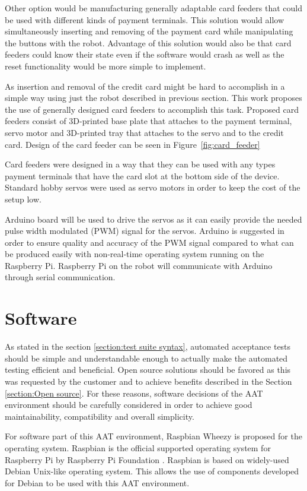 Other option would be manufacturing generally adaptable card feeders that could be used with different kinds of payment terminals. This solution would allow simultaneously inserting and removing of the payment card while manipulating the buttons with the robot. Advantage of this solution would also be that card feeders could know their state even if the software would crash as well as the reset functionality would be more simple to implement.

As insertion and removal of the credit card might be hard to accomplish in a simple way using just the robot described in previous section. This work proposes the use of generally designed card feeders to accomplish this task. Proposed card feeders consist of 3D-printed base plate that attaches to the payment terminal, servo motor and 3D-printed tray that attaches to the servo and to the credit card. Design of the card feeder can be seen in Figure~\ref{fig:card_feeder}

Card feeders were designed in a way that they can be used with any types payment terminals that have the card slot at the bottom side of the device. Standard hobby servos were used as servo motors in order to keep the cost of the setup low.

Arduino board will be used to drive the servos as it can easily provide the needed pulse width modulated (PWM) signal for the servos. Arduino is suggested in order to ensure quality and accuracy of the PWM signal compared to what can be produced easily with non-real-time operating system running on the Raspberry Pi. Raspberry Pi on the robot will communicate with Arduino through serial communication.

\section{Software}
\label{section:software}

As stated in the section \ref{section:test suite syntax}, automated acceptance tests should be simple and understandable enough to actually make the automated testing efficient and beneficial. Open source solutions should be favored as this was requested by the customer and to achieve benefits described in the Section \ref{section:Open source}. For these reasons, software decisions of the AAT environment should be carefully considered in order to achieve good maintainability, compatibility and overall simplicity.

For software part of this AAT environment, Raspbian Wheezy is proposed for the operating system. Raspbian is the official supported operating system for Raspberry Pi by Raspberry Pi Foundation \citep{raspbian}. Raspbian is based on widely-used Debian Unix-like operating system. This allows the use of components developed for Debian to be used with this AAT environment.

